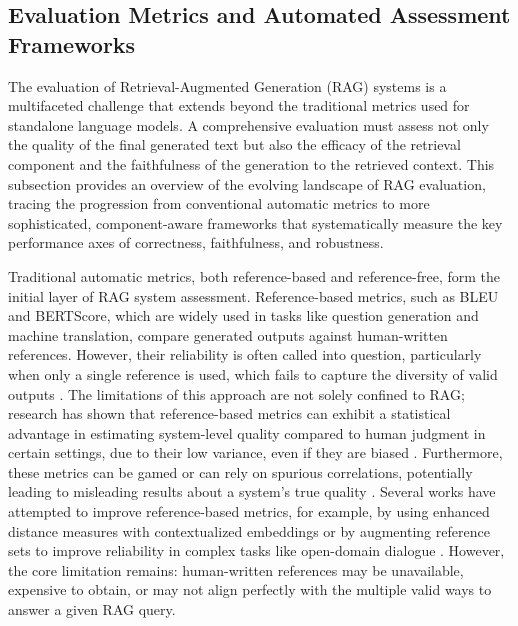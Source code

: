 \documentclass[11pt]{article}
\begin{document}
\subsection{Evaluation Metrics and Automated Assessment Frameworks}

The evaluation of Retrieval-Augmented Generation (RAG) systems is a multifaceted challenge that extends beyond the traditional metrics used for standalone language models. A comprehensive evaluation must assess not only the quality of the final generated text but also the efficacy of the retrieval component and the faithfulness of the generation to the retrieved context. This subsection provides an overview of the evolving landscape of RAG evaluation, tracing the progression from conventional automatic metrics to more sophisticated, component-aware frameworks that systematically measure the key performance axes of correctness, faithfulness, and robustness.

Traditional automatic metrics, both reference-based and reference-free, form the initial layer of RAG system assessment. Reference-based metrics, such as BLEU and BERTScore, which are widely used in tasks like question generation and machine translation, compare generated outputs against human-written references. However, their reliability is often called into question, particularly when only a single reference is used, which fails to capture the diversity of valid outputs \cite{ref403}. The limitations of this approach are not solely confined to RAG; research has shown that reference-based metrics can exhibit a statistical advantage in estimating system-level quality compared to human judgment in certain settings, due to their low variance, even if they are biased \cite{ref404}. Furthermore, these metrics can be gamed or can rely on spurious correlations, potentially leading to misleading results about a system's true quality \cite{ref405}. Several works have attempted to improve reference-based metrics, for example, by using enhanced distance measures with contextualized embeddings \cite{ref406} or by augmenting reference sets to improve reliability in complex tasks like open-domain dialogue \cite{ref407}. However, the core limitation remains: human-written references may be unavailable, expensive to obtain, or may not align perfectly with the multiple valid ways to answer a given RAG query.
\end{document}
